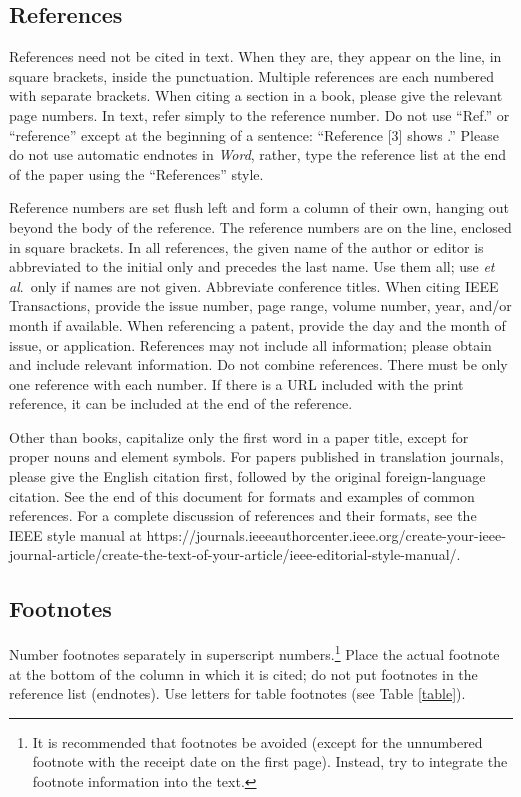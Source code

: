 \documentclass[journal,onecolumn,web]{ieeecolor}
\begin{document}
\subsection{References}
References need not be cited in text. When they are, they appear on the
line, in square brackets, inside the punctuation. Multiple references are
each numbered with separate brackets. When citing a section in a book,
please give the relevant page numbers. In text, refer simply to the
reference number. Do not use ``Ref.'' or ``reference'' except at the
beginning of a sentence: ``Reference [3] shows \textellipsis .'' Please do not use
automatic endnotes in \textit{Word}, rather, type the reference list at the end of the
paper using the ``References'' style.

Reference numbers are set flush left and form a column of their own, hanging
out beyond the body of the reference. The reference numbers are on the line,
enclosed in square brackets. In all references, the given name of the author
or editor is abbreviated to the initial only and precedes the last name. Use
them all; use \textit{et al}.\ only if names are not given.
Abbreviate conference titles. When citing IEEE Transactions,
provide the issue number, page range, volume number, year, and/or month if
available. When referencing a patent, provide the day and the month of
issue, or application. References may not include all information; please
obtain and include relevant information. Do not combine references. There
must be only one reference with each number. If there is a URL included with
the print reference, it can be included at the end of the reference.

Other than books, capitalize only the first word in a paper title, except
for proper nouns and element symbols. For papers published in translation
journals, please give the English citation first, followed by the original
foreign-language citation. See the end of this document for formats and
examples of common references. For a complete discussion of references and
their formats, see the IEEE style manual at 
https://\discretionary{}{}{}journals.ieeeauthorcenter.ieee.org/\discretionary{}{}{}create-your-ieee-journal-article/\discretionary{}{}{}create-the-text-of-your-article/\discretionary{}{}{}ieee-editorial-style-manual/.


\subsection{Footnotes}
Number footnotes separately in superscript numbers.\footnote{It is recommended that footnotes be avoided (except for 
the unnumbered footnote with the receipt date on the first page). Instead, 
try to integrate the footnote information into the text.} Place the actual 
footnote at the bottom of the column in which it is cited; do not put 
footnotes in the reference list (endnotes). Use letters for table footnotes 
(see Table \ref{table}).
\end{document}
